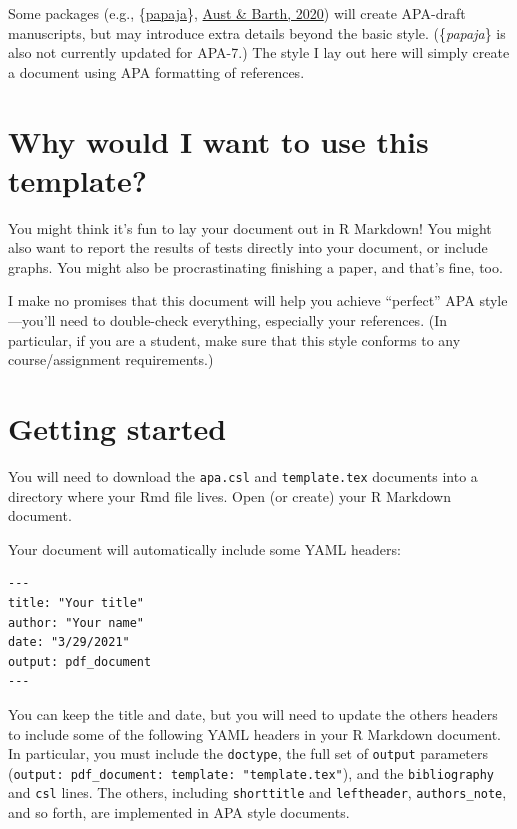 \documentclass[jou]{apa7}
\begin{document}
Some packages (e.g., \{\href{https://github.com/crsh/papaja}{papaja}\},
\protect\hyperlink{ref-austbarth2020}{Aust \& Barth, 2020}) will create
APA-draft manuscripts, but may introduce extra details beyond the basic
style. (\{\emph{papaja}\} is also not currently updated for APA-7.) The
style I lay out here will simply create a document using APA formatting
of references.

\hypertarget{why-would-i-want-to-use-this-template}{%
\section{Why would I want to use this
template?}\label{why-would-i-want-to-use-this-template}}

You might think it's fun to lay your document out in R Markdown! You
might also want to report the results of tests directly into your
document, or include graphs. You might also be procrastinating finishing
a paper, and that's fine, too.

I make no promises that this document will help you achieve ``perfect''
APA style---you'll need to double-check everything, especially your
references. (In particular, if you are a student, make sure that this
style conforms to any course/assignment requirements.)

\hypertarget{getting-started}{%
\section{Getting started}\label{getting-started}}

You will need to download the \texttt{apa.csl} and \texttt{template.tex}
documents into a directory where your Rmd file lives. Open (or create)
your R Markdown document.

Your document will automatically include some YAML headers:

\begin{verbatim}
---
title: "Your title"
author: "Your name"
date: "3/29/2021"
output: pdf_document
---
\end{verbatim}

You can keep the title and date, but you will need to update the others
headers to include some of the following YAML headers in your R Markdown
document. In particular, you must include the \texttt{doctype}, the full
set of \texttt{output} parameters
(\texttt{output:\ pdf\_document:\ template:\ "template.tex"}), and the
\texttt{bibliography} and \texttt{csl} lines. The others, including
\texttt{shorttitle} and \texttt{leftheader}, \texttt{authors\_note}, and
so forth, are implemented in APA style documents.
\end{document}
